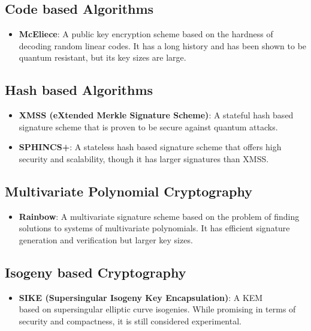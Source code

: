 \documentclass[a4paper,12pt]{article}
\begin{document}
\subsection{Code based Algorithms}
\begin{itemize}
    \item \textbf{McEliece}: A public key encryption scheme based on the hardness of decoding random linear codes. It has a long history and has been shown to be quantum resistant, but its key sizes are large.
\end{itemize}

\subsection{Hash based Algorithms}
\begin{itemize}
    \item \textbf{XMSS (eXtended Merkle Signature Scheme)}: A stateful hash based signature scheme that is proven to be secure against quantum attacks.
    \item \textbf{SPHINCS+}: A stateless hash based signature scheme that offers high security and scalability, though it has larger signatures than XMSS.
\end{itemize}

\subsection{Multivariate Polynomial Cryptography}
\begin{itemize}
    \item \textbf{Rainbow}: A multivariate signature scheme based on the problem of finding solutions to systems of multivariate polynomials. It has efficient signature generation and verification but larger key sizes.
\end{itemize}

\subsection{Isogeny based Cryptography}
\begin{itemize}
    \item \textbf{SIKE (Supersingular Isogeny Key Encapsulation)}: A KEM \\ based on supersingular elliptic curve isogenies. While promising in terms of security and compactness, it is still considered experimental.
\end{itemize}
\end{document}
